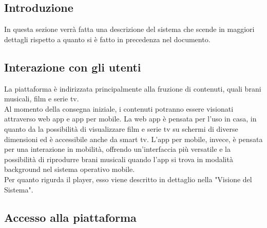 
\subsection{Introduzione}
In questa sezione verrà fatta una descrizione del sistema che scende in maggiori dettagli rispetto a quanto
si è fatto in precedenza nel documento.

\subsection{Interazione con gli utenti}
La piattaforma è indirizzata principalmente alla fruzione di contenuti, quali brani musicali, film e serie tv.\\
Al momento della consegna iniziale, i contenuti potranno essere visionati attraverso web app e app per mobile.
La web app è pensata per l'uso in casa, in quanto da la possibilità di visualizzare film e serie tv su schermi
di diverse dimensioni ed è accessibile anche da smart tv. L'app per mobile, invece, è pensata per una
interazione in mobilità, offrendo un'interfaccia più versatile e la possibilità di riprodurre brani musicali
quando l'app si trova in modalità background nel sistema operativo mobile.\\
Per quanto rigurda il player, esso viene descritto in dettaglio nella "Visione del Sistema".\\

\subsection{Accesso alla piattaforma}


